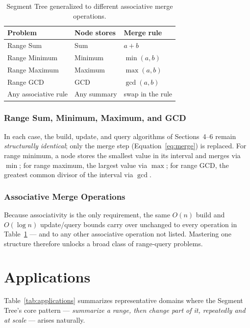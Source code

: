 \documentclass[11pt,open=any]{scrreprt}
\begin{document}
\begin{table}[h]
\centering
\caption{Segment Tree generalized to different associative merge operations.}
\label{tab:generalization}
\begin{tabular}{lll}
\toprule
\textbf{Problem} & \textbf{Node stores} & \textbf{Merge rule} \\
\midrule
Range Sum     & Sum         & $a+b$ \\
Range Minimum & Minimum     & $\min(a,b)$ \\
Range Maximum & Maximum     & $\max(a,b)$ \\
Range GCD     & GCD         & $\gcd(a,b)$ \\
\rowcolor{blue!10}
Any associative rule & Any summary & swap in the rule \\
\bottomrule
\end{tabular}
\end{table}

\subsection{Range Sum, Minimum, Maximum, and GCD}
In each case, the build, update, and query algorithms of Sections~4--6 remain \emph{structurally identical}; only the merge step (Equation~\eqref{eq:merge}) is replaced. For range minimum, a node stores the smallest value in its interval and merges via $\min$; for range maximum, the largest value via $\max$; for range GCD, the greatest common divisor of the interval via $\gcd$.

\subsection{Associative Merge Operations}
Because associativity is the only requirement, the same $O(n)$ build and $O(\log n)$ update/query bounds carry over unchanged to every operation in Table~\ref{tab:generalization} --- and to any other associative operation not listed. Mastering one structure therefore unlocks a broad class of range-query problems.

\chapter{Applications}

Table~\ref{tab:applications} summarizes representative domains where the Segment Tree's core pattern --- \emph{summarize a range, then change part of it, repeatedly and at scale} --- arises naturally.
\end{document}
